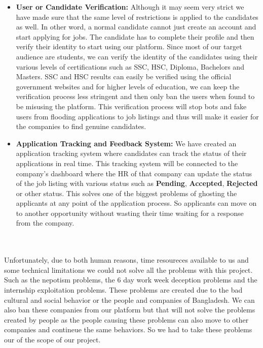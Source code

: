 \documentclass[a4paper, 14pt, openany]{extreport}
\begin{document}
\begin{itemize}
		\item \textbf{User or Candidate Verification:} Although it may seem very strict we have made sure that the same level of restrictions is applied to the candidates as well. In other word, a normal candidate cannot just create an account and start applying for jobs. The candidate has to complete their profile and then verify their identity to start using our platform. Since most of our target audience are students, we can verify the identity of the candidates using their various levels of certifications such as SSC, HSC, Diploma, Bachelors and Masters. SSC and HSC results can easily be verified using the official government websites and for higher levels of education, we can keep the verification process less stringent and then only ban the users when found to be misusing the platform. This verification process will stop bots and fake users from flooding applications to job listings and thus will make it easier for the companies to find genuine candidates.
		\item \textbf{Application Tracking and Feedback System:} We have created an application tracking system where candidates can track the status of their applications in real time. This tracking system will be connected to the company's dashboard where the HR of that company can update the status of the job listing with various status such as \textbf{Pending}, \textbf{Accepted}, \textbf{Rejected} or other status. This solves one of the biggest problems of ghosting the applicants at any point of the application process. So applicants can move on to another opportunity without wasting their time waiting for a response from the company. 
 	\end{itemize}
	\\
	\\
	Unfortunately, due to both human reasons, time resoureces available to us and some technical limitations we could not solve all the problems with this project. Such as the nepotism problems, the 6 day work week deception problems and the internship exploitation problems. These problems are created due to the bad cultural and social behavior or the people and companies of Bangladesh. We can also ban these companies from our platform but that will not solve the problems created by people as the people causing these problems can also move to other companies and contineue the same behaviors. So we had to take these problems our of the scope of our project. 
	\\
\end{document}
